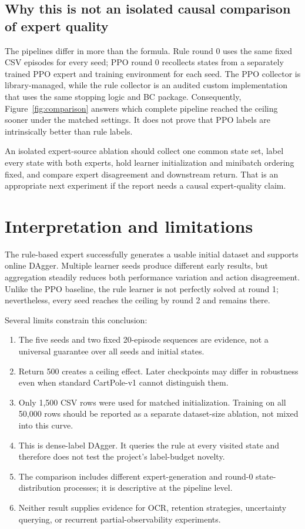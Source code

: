 \documentclass[11pt]{article}
\begin{document}
\subsection{Why this is not an isolated causal comparison of expert quality}

The pipelines differ in more than the formula. Rule round 0 uses the same fixed CSV episodes for every seed; PPO round 0 recollects states from a separately trained PPO expert and training environment for each seed. The PPO collector is library-managed, while the rule collector is an audited custom implementation that uses the same stopping logic and BC package. Consequently, Figure~\ref{fig:comparison} answers which complete pipeline reached the ceiling sooner under the matched settings. It does not prove that PPO labels are intrinsically better than rule labels.

An isolated expert-source ablation should collect one common state set, label every state with both experts, hold learner initialization and minibatch ordering fixed, and compare expert disagreement and downstream return. That is an appropriate next experiment if the report needs a causal expert-quality claim.

\section{Interpretation and limitations}

The rule-based expert successfully generates a usable initial dataset and supports online DAgger. Multiple learner seeds produce different early results, but aggregation steadily reduces both performance variation and action disagreement. Unlike the PPO baseline, the rule learner is not perfectly solved at round 1; nevertheless, every seed reaches the ceiling by round 2 and remains there.

Several limits constrain this conclusion:
\begin{enumerate}
  \item The five seeds and two fixed 20-episode sequences are evidence, not a universal guarantee over all seeds and initial states.
  \item Return 500 creates a ceiling effect. Later checkpoints may differ in robustness even when standard CartPole-v1 cannot distinguish them.
  \item Only 1,500 CSV rows were used for matched initialization. Training on all 50,000 rows should be reported as a separate dataset-size ablation, not mixed into this curve.
  \item This is dense-label DAgger. It queries the rule at every visited state and therefore does not test the project's label-budget novelty.
  \item The comparison includes different expert-generation and round-0 state-distribution processes; it is descriptive at the pipeline level.
  \item Neither result supplies evidence for OCR, retention strategies, uncertainty querying, or recurrent partial-observability experiments.
\end{enumerate}
\end{document}
